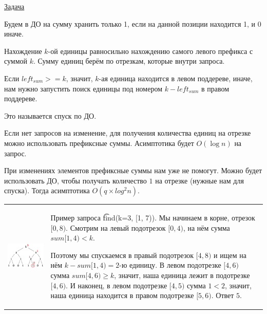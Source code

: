  \href{https://codeforces.com/edu/course/2/lesson/4/2/practice/contest/273278/problem/B}{Задача}

Будем в ДО на сумму хранить только 1, если на данной позиции находится 1, и 0 иначе.
\down

Нахождение $k$-ой единицы равносильно нахождению самого левого префикса с суммой $k$. Сумму единиц берём по отрезкам, которые внутри запроса.

Если $left_{sum} >= k$, значит, $k$-ая единица находится в левом поддереве, иначе, нам нужно запустить поиск единицы под номером $k - left_{sum}$ в правом поддереве.

Это называется спуск по ДО.

\down

Если нет запросов на изменение, для получения количества единиц на отрезке можно использовать префиксные суммы. 
Асимптотика будет $O(\log n)$ на запрос.

При изменениях элементов префиксные суммы нам уже не помогут. Можно будет использовать ДО, чтобы получать количество $1$ на отрезке (нужные нам для спуска). Тогда асимптотика $O(q \times log^2 n)$. 

\begin{tabular}{cm{}}
	\begin{minipage}{4cm}
		\includegraphics[scale=0.5]{files/k-th.png}
	\end{minipage} 
	&
	Пример запроса \t{find(k=3, [1, 7))}. Мы начинаем в корне, отрезок $[0,8)$. Смотрим на левый подотрезок $[0, 4)$, на нём сумма $sum [1,4) < k$. 
	
	Поэтому мы спускаемся в правый подотрезок $[4,8)$ и ищем на нём $k-sum [1, 4) = 2$-ю единицу. В левом подотрезке $[4,6)$ сумма $sum [4, 6) \ge k$, значит, наша единица лежит в подотрезке $[4,6)$. И наконец, в левом подотрезке $[4,5)$ сумма $1 < 2$, значит, наша единица находится в правом подотрезке $[5,6)$. Ответ $5$.
\end{tabular}

